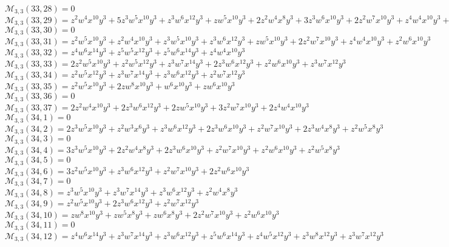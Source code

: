 \documentclass[12pt]{memoireuqam1.3}
\begin{document}
$\mathcal{M}_{3,3}(33,28)=0$\\
$\mathcal{M}_{3,3}(33,29)=z^2w^4x^{10}y^3+5z^3w^5x^{10}y^3+z^3w^6x^{12}y^3+zw^5x^{10}y^3+2z^2w^4x^8y^3+3z^3w^6x^{10}y^3+2z^2w^7x^{10}y^3+z^4w^4x^{10}y^3+z^2w^5x^8y^3$\\
$\mathcal{M}_{3,3}(33,30)=0$\\
$\mathcal{M}_{3,3}(33,31)=z^2w^5x^{10}y^3+z^2w^4x^{10}y^3+z^3w^5x^{10}y^3+z^3w^6x^{12}y^3+zw^5x^{10}y^3+2z^2w^7x^{10}y^3+z^4w^4x^{10}y^3+z^2w^6x^{10}y^3$\\
$\mathcal{M}_{3,3}(33,32)=z^4w^6x^{14}y^3+z^5w^5x^{12}y^3+z^5w^6x^{14}y^3+z^4w^4x^{10}y^3$\\
$\mathcal{M}_{3,3}(33,33)=2z^2w^5x^{10}y^3+z^2w^5x^{12}y^3+z^3w^7x^{14}y^3+2z^3w^6x^{12}y^3+z^2w^6x^{10}y^3+z^3w^7x^{12}y^3$\\
$\mathcal{M}_{3,3}(33,34)=z^2w^5x^{12}y^3+z^3w^7x^{14}y^3+z^3w^6x^{12}y^3+z^2w^7x^{12}y^3$\\
$\mathcal{M}_{3,3}(33,35)=z^2w^5x^{10}y^3+2zw^8x^{10}y^3+w^6x^{10}y^3+zw^6x^{10}y^3$\\
$\mathcal{M}_{3,3}(33,36)=0$\\
$\mathcal{M}_{3,3}(33,37)=2z^2w^4x^{10}y^3+2z^3w^6x^{12}y^3+2zw^5x^{10}y^3+3z^2w^7x^{10}y^3+2z^4w^4x^{10}y^3$\\
$\mathcal{M}_{3,3}(34,1)=0$\\
$\mathcal{M}_{3,3}(34,2)=2z^3w^5x^{10}y^3+z^2w^3x^6y^3+z^3w^6x^{12}y^3+2z^3w^6x^{10}y^3+z^2w^7x^{10}y^3+2z^3w^4x^8y^3+z^2w^5x^8y^3$\\
$\mathcal{M}_{3,3}(34,3)=0$\\
$\mathcal{M}_{3,3}(34,4)=3z^3w^5x^{10}y^3+2z^2w^4x^8y^3+2z^3w^6x^{10}y^3+z^2w^7x^{10}y^3+z^2w^6x^{10}y^3+z^2w^5x^8y^3$\\
$\mathcal{M}_{3,3}(34,5)=0$\\
$\mathcal{M}_{3,3}(34,6)=3z^2w^5x^{10}y^3+z^3w^6x^{12}y^3+z^2w^7x^{10}y^3+2z^2w^6x^{10}y^3$\\
$\mathcal{M}_{3,3}(34,7)=0$\\
$\mathcal{M}_{3,3}(34,8)=z^3w^5x^{10}y^3+z^3w^7x^{14}y^3+z^3w^6x^{12}y^3+z^2w^4x^8y^3$\\
$\mathcal{M}_{3,3}(34,9)=z^2w^5x^{10}y^3+2z^3w^6x^{12}y^3+z^2w^7x^{12}y^3$\\
$\mathcal{M}_{3,3}(34,10)=zw^8x^{10}y^3+zw^5x^8y^3+zw^6x^8y^3+2z^2w^7x^{10}y^3+z^2w^6x^{10}y^3$\\
$\mathcal{M}_{3,3}(34,11)=0$\\
$\mathcal{M}_{3,3}(34,12)=z^4w^6x^{14}y^3+z^3w^7x^{14}y^3+z^3w^6x^{12}y^3+z^5w^6x^{14}y^3+z^4w^5x^{12}y^3+z^3w^8x^{12}y^3+z^3w^7x^{12}y^3$\\
\end{document}
